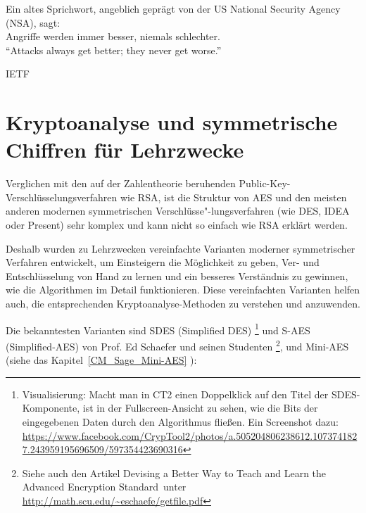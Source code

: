 \begin{refsegment}
\begin{ctsquote}
    Ein altes Sprichwort, angeblich geprägt von der
    US National Security Agency (NSA), sagt:\\
    \glqq Angriffe werden immer besser, niemals schlechter.\grqq\\
    ``Attacks always get better; they never get worse.''
\caption[IETF]{IETF\footnotemark}
\end{ctsquote}
\addtocounter{footnote}{0}

\section[Kryptoanalyse und symmetrische Chiffren für Lehrzwecke]{Kryptoanalyse und symmetrische Chiffren für Lehrzwecke\footnotemark}
\label{CM_Analysis-SymCiphers-Educational}

Verglichen mit den auf der Zahlentheorie beruhenden Public-Key-Verschlüsselungsverfahren wie RSA, ist die Struktur von AES und den meisten anderen modernen symmetrischen Verschlüsse"-lungsverfahren (wie DES, IDEA oder Present) sehr komplex und kann nicht so einfach wie RSA erklärt werden.

Deshalb wurden zu Lehrzwecken vereinfachte Varianten moderner
symmetrischer Verfahren entwickelt, um Einsteigern die Möglichkeit zu geben,
Ver- und Entschlüsselung von Hand zu lernen und ein besseres Verständnis zu
gewinnen, wie die Algorithmen im Detail funktionieren.
Diese vereinfachten Varianten helfen auch, die entsprechenden
Kryptoanalyse-Methoden zu verstehen und anzuwenden.

Die bekanntesten Varianten sind SDES (Simplified DES)%
\footnote{
  Visualisierung: Macht man in CT2 einen Doppelklick auf den Titel der
  SDES-Komponente, ist in der Fullscreen-Ansicht
  zu sehen, wie die Bits der eingegebenen Daten durch den Algorithmus fließen.
  Ein Screen\-shot dazu:
  \url{https://www.facebook.com/CrypTool2/photos/a.505204806238612.1073741827.243959195696509/597354423690316}
}
und S-AES (Simplified-AES) von Prof. Ed Schaefer und seinen Studenten%
\footnote{
    Siehe auch den Artikel \glqq Devising a Better Way to Teach and Learn
    the Advanced Encryption Standard\grqq~unter
    \url{http://math.scu.edu/~eschaefe/getfile.pdf}
},
und Mini-AES (siehe das Kapitel~\ref{CM_Sage_Mini-AES} \glqq {}\grqq):


\end{refsegment}
